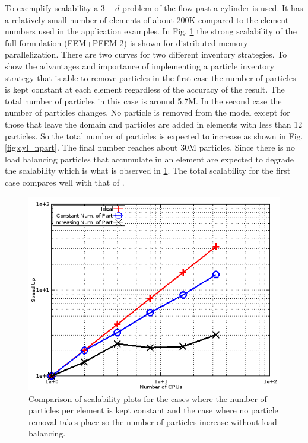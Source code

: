 To exemplify scalability a $3-d$ problem of the flow past a cylinder is used. It has a relatively small number of elements of about 200K compared to the element numbers used in the application examples. 
In Fig. \ref{fig:scalab} the strong scalability of the full formulation (FEM+PFEM-2) is shown for distributed memory parallelization. There are two curves for two different inventory strategies. To show the advantages and importance of implementing a particle inventory strategy that is able to remove particles in the first case the number of particles is kept constant at each element regardless of the accuracy of the result. The total number of particles in this case is around 5.7M. In the second case the number of particles changes. No particle is removed from the model except for those that leave the domain and particles are added in elements with less than 12 particles. So the total number of particles is expected to increase as shown in Fig. \ref{fig:cyl_npart}. The final number reaches about 30M particles. Since there is no load balancing particles that accumulate in an element are expected to degrade the scalability which is what is observed in \ref{fig:scalab}. The total scalability for the first case compares well with that of \cite{gimenez:parallel}.
%
\begin{figure}[htp] 
\centering 
\includegraphics[scale=.6]{./imgs/scalability1.png}
\caption{Comparison of scalability plots for the cases where the number of particles per element is kept constant and the case where no particle removal takes place so the number of particles increase without load balancing.}
\label{fig:scalab}
\end{figure}
